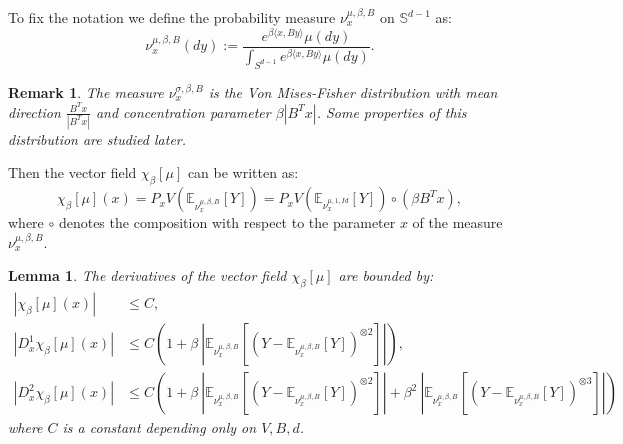 \documentclass{article}
\numberwithin{theorem}{section}
\newtheorem{lemma}[theorem]{Lemma}
\newtheorem{remark}[theorem]{Remark}
\begin{document}
To fix the notation we define the probability measure $\nu_x^{\mu,\beta, B}$ on $\mathbb{S}^{d-1}$ as:
$$
\nu_x^{\mu, \beta, B}(dy) := \frac{e^{\beta\langle x, By \rangle} \mu (dy)}{\int_{S^{d-1}} e^{\beta\langle x, By \rangle} \mu(dy)}.
$$

\begin{remark}
    The measure $\nu^{\sigma, \beta, B}_x$ is the Von Mises-Fisher distribution with mean direction $\frac{B^Tx}{|B^Tx|}$ and concentration parameter $\beta |B^Tx|$. Some properties of this distribution are studied later.
\end{remark}

Then the vector field $\chi_\beta[\mu]$ can be written as:
$$
\chi_\beta[\mu](x) = P_xV \left(\mathbb{E}_{\nu^{\mu, \beta, B}_x}[Y]\right) = P_xV \left(\mathbb{E}_{\nu^{\mu, 1, Id}_x}[Y]\right) \circ (\beta B^Tx),
$$
where $\circ$ denotes the composition with respect to the parameter $x$ of the measure $\nu_x^{\mu,\beta, B}$.
\begin{lemma}
\label{lem:chi_cumulants}
The derivatives of the vector field $\chi_\beta[\mu]$ are bounded by:
   \begin{align*}
    |\chi_\beta[\mu](x)| & \leq C,\\
    |D^1_x \chi_\beta[\mu](x)| & \leq C\left(1+\beta\ | \mathbb{E}_{\nu_{x}^{\mu,\beta,B}}[\left(Y-\mathbb{E}_{\nu_{x}^{\mu,\beta,B}}[Y]\right)^{\otimes 2}]|\right),\\
    |D^2_x\chi_\beta[\mu](x)| &\leq C\left(1+ \beta\ | \mathbb{E}_{\nu_{x}^{\mu,\beta,B}}[\left(Y-\mathbb{E}_{\nu_{x}^{\mu,\beta,B}}[Y]\right)^{\otimes 2}]|+\beta^2 \ | \mathbb{E}_{\nu_{x}^{\mu,\beta,B}}[\left(Y-\mathbb{E}_{\nu_{x}^{\mu,\beta,B}}[Y]\right)^{\otimes 3}]|\right)
\end{align*}
where $C$ is a constant depending only on $V,B,d$.
\end{lemma}
\end{document}
